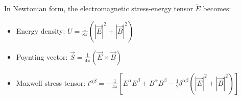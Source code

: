 In Newtonian form, the electromagnetic stress-energy tensor $\tilde{E}$ becomes:
\begin{itemize}
  \item Energy density: $U = \frac{1}{8\pi}(|\vec{E}|^2 + |\vec{B}|^2)$
  \item Poynting vector: $\vec{S} = \frac{1}{4\pi}(\vec{E} \times \vec{B})$
  \item Maxwell stress tensor: $t^{\alpha\beta} = -\frac{1}{4\pi}\left[E^\alpha E^\beta + B^\alpha B^\beta - \frac{1}{2}\delta^{\alpha\beta}(|\vec{E}|^2 + |\vec{B}|^2)\right]$
\end{itemize}